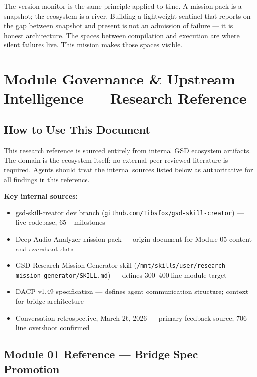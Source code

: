 \documentclass[11pt,letterpaper]{article}
\newcommand{\stageheader}[2]{%
  \noindent\colorbox{#2}{\makebox[\textwidth][l]{%
    \textcolor{white}{\bfseries\sffamily\hspace{6pt}#1\hspace{6pt}}}}%
  \vspace{0.5em}\par%
}
\begin{document}
The version monitor is the same principle applied to time. A mission pack is a snapshot; the ecosystem is a river. Building a lightweight sentinel that reports on the gap between snapshot and present is not an admission of failure --- it is honest architecture. The spaces between compilation and execution are where silent failures live. This mission makes those spaces visible.

\newpage
\stageheader{STAGE 2 --- RESEARCH REFERENCE}{secondary}

\section{Module Governance \& Upstream Intelligence --- Research Reference}

\subsection{How to Use This Document}

This research reference is sourced entirely from internal GSD ecosystem artifacts. The domain is the ecosystem itself: no external peer-reviewed literature is required. Agents should treat the internal sources listed below as authoritative for all findings in this reference.

\textbf{Key internal sources:}
\begin{itemize}[noitemsep]
  \item gsd-skill-creator dev branch (\texttt{github.com/Tibsfox/gsd-skill-creator}) --- live codebase, 65+ milestones
  \item Deep Audio Analyzer mission pack --- origin document for Module 05 content and overshoot data
  \item GSD Research Mission Generator skill (\texttt{/mnt/skills/user/research-mission-generator/SKILL.md}) --- defines 300--400 line module target
  \item DACP v1.49 specification --- defines agent communication structure; context for bridge architecture
  \item Conversation retrospective, March 26, 2026 --- primary feedback source; 706-line overshoot confirmed
\end{itemize}

\subsection{Module 01 Reference --- Bridge Spec Promotion}
\end{document}
